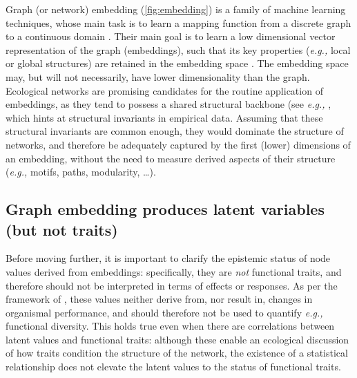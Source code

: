 Graph (or network) embedding (\autoref{fig:embedding}) is a family of machine
learning techniques, whose main task is to learn a mapping function from
a discrete graph to a continuous domain \cite{Arsov2019Network,
Chami2022Machine}. Their main goal is to learn a low dimensional
vector representation of the graph (embeddings), such that its key
properties (\emph{e.g.,} local or global structures) are retained in the
embedding space \cite{Yan2005Graph}. The embedding space may, but will
not necessarily, have lower dimensionality than the graph. Ecological
networks are promising candidates for the routine application of
embeddings, as they tend to possess a shared structural backbone (see
\emph{e.g.,} \cite{BramonMora2018Identifying}, which hints at structural
invariants in empirical data. Assuming that these structural invariants
are common enough, they would dominate the structure of networks, and
therefore be adequately captured by the first (lower) dimensions of an
embedding, without the need to measure derived aspects of their
structure (\emph{e.g.,} motifs, paths, modularity, \ldots).

\subsection{Graph embedding produces latent variables (but not
traits)}\label{graph-embedding-produces-latent-variables-but-not-traits}

Before moving further, it is important to clarify the epistemic status
of node values derived from embeddings: specifically, they are
\emph{not} functional traits, and therefore should not be interpreted in
terms of effects or responses. As per the framework of
\cite{Malaterre2019Functional}, these values neither derive from, nor result
in, changes in organismal performance, and should therefore not be used
to quantify \emph{e.g.,} functional diversity. This holds true even when
there are correlations between latent values and functional traits:
although these enable an ecological discussion of how traits condition
the structure of the network, the existence of a statistical
relationship does not elevate the latent values to the status of
functional traits.

